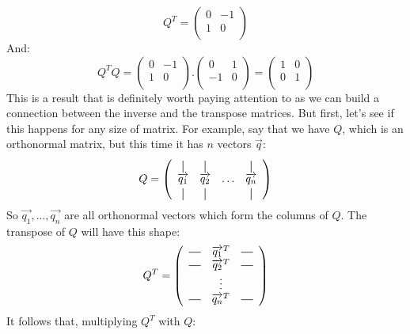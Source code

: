\documentclass[600paper, 11pt,twoside,openany]{kdp}
\begin{document}
\[Q^T = \begin{pmatrix}
0 & -1 \\
1 & 0 \\
\end{pmatrix}
\]
\indent And:
\[Q^TQ = \begin{pmatrix}
0 & -1 \\
1 & 0 \\
\end{pmatrix}.\begin{pmatrix}
0 & 1 \\
-1 & 0 \\
\end{pmatrix} = \begin{pmatrix}
1 & 0 \\
0 & 1 \\
\end{pmatrix} \]
\indent This is a result that is definitely worth paying attention to as we can build a connection between the inverse and the transpose matrices. But first, let’s see if this happens for any size of matrix. For example, say that we have $Q$, which is an orthonormal matrix, but this time it has $n$ vectors $\overrightarrow{q}$:
\newcommand*{\vertbar}{\rule[-1ex]{0.5pt}{2.5ex}}
\newcommand*{\horzbar}{\rule[.5ex]{2.5ex}{0.5pt}}
\[
Q = 
\left(
  \begin{array}{cccc}
    \vertbar & \vertbar &        & \vertbar \\
    \overrightarrow{q_{1}}    & \overrightarrow{q_{2}}    & \ldots & \overrightarrow{q_{n}}    \\
    \vertbar & \vertbar &        & \vertbar 
  \end{array}
\right)
\]
\indent So $\overrightarrow{q_{1}},...,\overrightarrow{q_{n}}$ are all orthonormal vectors which form the columns of $Q$. The transpose of $Q$ will have this shape:
\setlength{\extrarowheight}{1ex}
\[
Q^T =
\left(
  \begin{array}{ccc}
    \horzbar & \overrightarrow{q_{1}}^T & \horzbar \\
    \horzbar & \overrightarrow{q_{2}}^T & \horzbar \\
             & \vdots    &          \\
    \horzbar & \overrightarrow{q_{n}}^T & \horzbar
  \end{array}
\right)
\]
\indent It follows that, multiplying $Q^T$ with $Q$:
\end{document}
